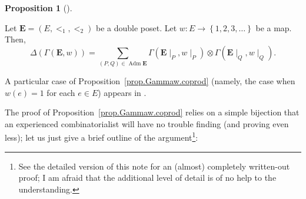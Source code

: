 \documentclass[numbers=enddot,12pt,final,onecolumn,notitlepage,abstracton]{scrartcl}%
\theoremstyle{definition}
\newtheorem{prop}[theo]{Proposition}
\newenvironment{proposition}[1][]
{\begin{prop}[#1]\begin{leftbar}}
{\end{leftbar}\end{prop}}
\let\sumnonlimits\sum
\renewcommand{\sum}{\sumnonlimits\limits}
\newcommand{\Adm}{\operatorname{Adm}}
\newcommand{\EE}{{\mathbf{E}}}
\begin{document}
\begin{proposition}
\label{prop.Gammaw.coprod}
Let $\EE = \left(E, <_1, <_2\right)$ be a double poset. Let
$w : E \to \left\{1, 2, 3, \ldots\right\}$ be a map.
Then,
\begin{equation}
\label{eq.prop.Gammaw.coprod}
\Delta\left(\Gamma\left(\EE, w\right)\right)
= \sum_{\left(P, Q\right) \in \Adm \EE}
\Gamma\left(\EE\mid_P, w\mid_P\right)
\otimes \Gamma\left(\EE\mid_Q, w\mid_Q\right) .
\end{equation}
\end{proposition}

A particular case of Proposition~\ref{prop.Gammaw.coprod} (namely,
the case when $w\left(e\right) = 1$ for each $e \in E$) appears in
\cite[Th\'eor\`eme 4.16]{Malve-Thesis}.


The proof of Proposition~\ref{prop.Gammaw.coprod} relies on
a simple bijection that an experienced combinatorialist will
have no trouble finding (and proving even less); let us just
give a brief outline of the argument\footnote{See the detailed
version of this note for an (almost) completely written-out
proof; I am afraid that the additional level of detail is of
no help to the understanding.}:
\end{document}
